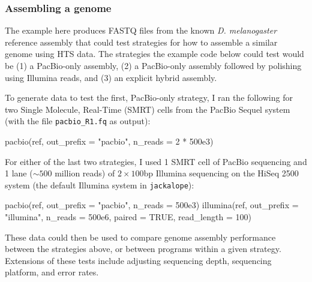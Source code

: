 \documentclass[12pt,]{article}
\newenvironment{Shaded}{}{}
\newcommand{\DataTypeTok}[1]{#1}
\newcommand{\DecValTok}[1]{#1}
\newcommand{\FloatTok}[1]{#1}
\newcommand{\KeywordTok}[1]{\textcolor[rgb]{0.00,0.00,1.00}{#1}}
\newcommand{\NormalTok}[1]{#1}
\newcommand{\OperatorTok}[1]{#1}
\newcommand{\OtherTok}[1]{\textcolor[rgb]{1.00,0.25,0.00}{#1}}
\newcommand{\StringTok}[1]{\textcolor[rgb]{0.00,0.50,0.50}{#1}}
\begin{document}
\hypertarget{assembling-a-genome}{%
\subsubsection{Assembling a genome}\label{assembling-a-genome}}

The example here produces FASTQ files from the known \emph{D. melanogaster} reference
assembly that could test strategies for how to assemble a similar genome using HTS data.
The strategies the example code below could test would be
(1) a PacBio-only assembly,
(2) a PacBio-only assembly followed by polishing using Illumina reads, and
(3) an explicit hybrid assembly.

To generate data to test the first, PacBio-only strategy, I ran
the following for two Single Molecule, Real-Time (SMRT) cells from the PacBio Sequel
system (with the file \texttt{pacbio\_R1.fq} as output):

\begin{Shaded}
\begin{Highlighting}[]
\KeywordTok{pacbio}\NormalTok{(ref, }\DataTypeTok{out_prefix =} \StringTok{"pacbio"}\NormalTok{, }\DataTypeTok{n_reads =} \DecValTok{2} \OperatorTok{*}\StringTok{ }\FloatTok{500e3}\NormalTok{)}
\end{Highlighting}
\end{Shaded}

For either of the last two strategies, I used
1 SMRT cell of PacBio sequencing and
1 lane (\(\sim 500\) million reads) of \(2 \times 100\)bp Illumina
sequencing on the HiSeq 2500 system (the default Illumina system in \texttt{jackalope}):

\begin{Shaded}
\begin{Highlighting}[]
\KeywordTok{pacbio}\NormalTok{(ref, }\DataTypeTok{out_prefix =} \StringTok{"pacbio"}\NormalTok{, }\DataTypeTok{n_reads =} \FloatTok{500e3}\NormalTok{)}
\KeywordTok{illumina}\NormalTok{(ref, }\DataTypeTok{out_prefix =} \StringTok{"illumina"}\NormalTok{, }\DataTypeTok{n_reads =} \FloatTok{500e6}\NormalTok{, }\DataTypeTok{paired =} \OtherTok{TRUE}\NormalTok{,}
         \DataTypeTok{read_length =} \DecValTok{100}\NormalTok{)}
\end{Highlighting}
\end{Shaded}

These data could then be used to compare genome assembly performance between
the strategies above, or between programs within a given strategy.
Extensions of these tests include adjusting sequencing depth, sequencing platform,
and error rates.
\end{document}
